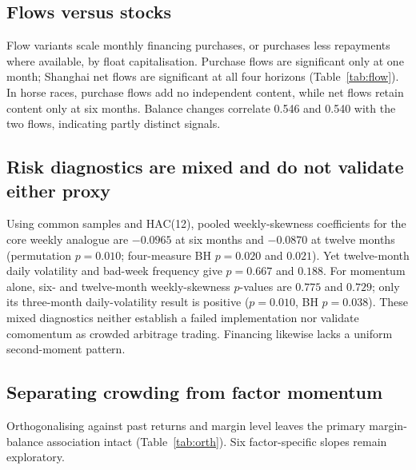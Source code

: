\documentclass[final,1p,authoryear]{elsarticle}
\begin{document}
\begin{table}[htbp]\centering
\caption{Leg decomposition of the crowding association}
\label{tab:legs}

\end{table}

\newpage

\subsection{Flows versus stocks}

\noindent Flow variants scale monthly financing purchases, or purchases less repayments where
available, by float capitalisation. Purchase flows are significant only at one month; Shanghai
net flows are significant at all four horizons (Table~\ref{tab:flow}). In horse races, purchase
flows add no independent content, while net flows retain content only at six months. Balance
changes correlate 0.546 and 0.540 with the two flows, indicating partly distinct signals.

\begin{table}[htbp]\centering
\caption{Financing flows versus balance changes}
\label{tab:flow}

\end{table}


\subsection{Risk diagnostics are mixed and do not validate either proxy}

\noindent Using common samples and HAC(12), pooled weekly-skewness coefficients for the core weekly
analogue are $-0.0965$ at six months and $-0.0870$ at twelve months (permutation $p=0.010$;
four-measure BH $p=0.020$ and $0.021$). Yet twelve-month daily volatility and bad-week frequency
give $p=0.667$ and $0.188$. For momentum alone, six- and twelve-month weekly-skewness $p$-values
are $0.775$ and $0.729$; only its three-month daily-volatility result is positive ($p=0.010$,
BH $p=0.038$). These mixed diagnostics neither establish a failed implementation nor validate
comomentum as crowded arbitrage trading. Financing likewise lacks a uniform second-moment pattern.


\subsection{Separating crowding from factor momentum}

\noindent Orthogonalising against past returns and margin level leaves the primary margin-balance
association intact (Table~\ref{tab:orth}). Six factor-specific slopes remain exploratory.
\end{document}
